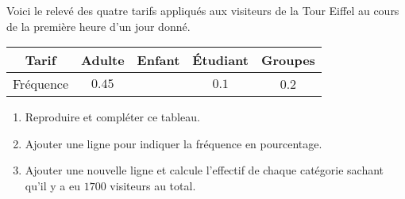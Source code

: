 
\begin{exercice}\label{exo2smath-0302}


Voici le relevé des quatre tarifs appliqués aux visiteurs de la Tour Eiffel au cours de la première heure d'un jour donné.

\begin{center}
\begin{tabular}[]{|c|c|c|c|c|}
    \hline
    Tarif&Adulte&Enfant&Étudiant&Groupes\\
    \hline
    Fréquence&\( 0.45\)&&\( 0.1\)&0.2\\
    \hline
\end{tabular}
    
\end{center}

\begin{enumerate}
    \item
        
 Reproduire et compléter ce tableau.
 \item
Ajouter une ligne pour indiquer la fréquence en pourcentage.
\item
 Ajouter une nouvelle ligne et calcule l'effectif de chaque catégorie sachant qu'il y a eu $1 700$ visiteurs au total.
\end{enumerate}

\end{exercice}
